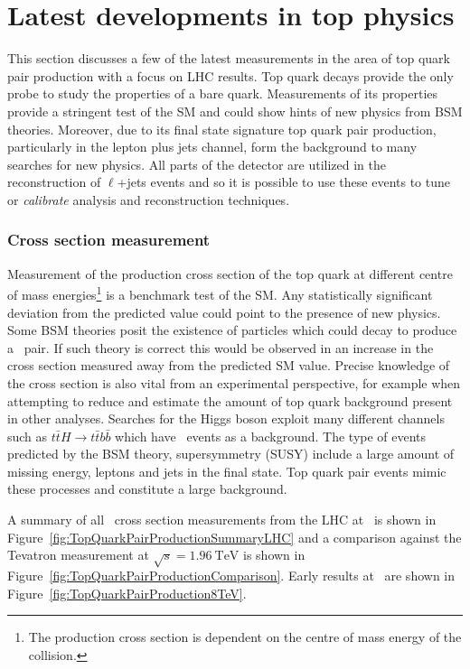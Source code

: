 \section{Latest developments in top physics}

This section discusses a few of the latest measurements in the area of top quark pair production with a focus on LHC results. Top quark decays provide the only probe to study the properties of a bare quark. Measurements of its properties provide a stringent test of the SM and could show hints of new physics from BSM theories. Moreover, due to its final state signature top quark pair production, particularly in the lepton plus jets channel, form the background to many searches for new physics.  All parts of the detector are utilized in the reconstruction of $\ell$+jets events and so it is possible to use these events to tune or \textit{calibrate} analysis and reconstruction techniques.

\subsubsection{Cross section measurement}

Measurement of the production cross section of the top quark at different centre of mass energies\footnote{The production cross section is dependent on the centre of mass energy of the collision.} is a benchmark test of the SM. Any statistically significant deviation from the predicted value could point to the presence of new physics. Some BSM theories posit the existence of particles which could decay to produce a \ttbar\ pair. If such theory is correct this would be observed in an increase in the cross section measured away from the predicted SM value. Precise knowledge of the cross section is also vital from an experimental perspective, for example when attempting to reduce and estimate the amount of top quark background present in other analyses. Searches for the Higgs boson exploit many different channels such as $t\bar{t}H\rightarrow t\bar{t}b\bar{b}$ which have \ttbar\ events as a background. The type of events predicted by the BSM theory, supersymmetry (SUSY) include a large amount of missing energy, leptons and jets in the final state. Top quark pair events mimic these processes and constitute a large background.

A summary of all \ttbar\ cross section measurements from the LHC at \cmsS\ is shown in Figure~\ref{fig:TopQuarkPairProductionSummaryLHC} and a comparison against the Tevatron measurement at $\sqrt{s}=\SI{1.96}{\TeV}$ is shown in Figure~\ref{fig:TopQuarkPairProductionComparison}. Early results at \cmsE\ are shown in Figure~\ref{fig:TopQuarkPairProduction8TeV}.

